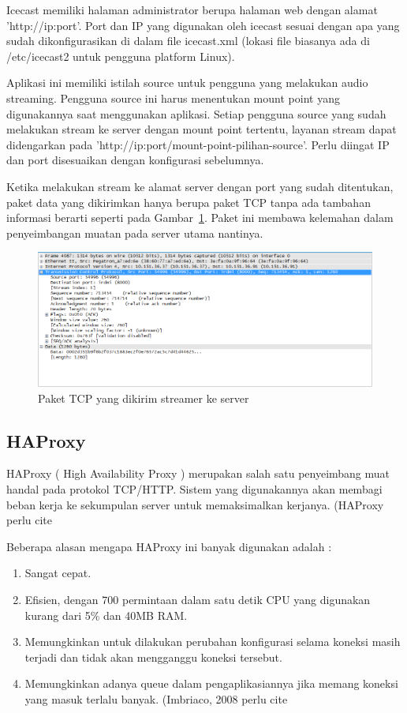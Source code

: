 \documentclass[conference]{IEEEtran}
\begin{document}
	\indent
	Icecast memiliki halaman administrator berupa halaman web dengan alamat 'http://ip:port'. Port dan IP yang digunakan oleh icecast sesuai dengan apa yang sudah dikonfigurasikan di dalam file icecast.xml (lokasi file biasanya ada di /etc/icecast2 untuk pengguna platform Linux).
	
	\indent
	Aplikasi ini memiliki istilah source untuk pengguna yang melakukan audio streaming. Pengguna source ini harus menentukan mount point yang digunakannya saat menggunakan aplikasi. Setiap pengguna source yang sudah melakukan stream ke server dengan mount point tertentu, layanan stream dapat didengarkan pada 'http://ip:port/mount-point-pilihan-source'. Perlu diingat IP dan port disesuaikan dengan konfigurasi sebelumnya.
	
	\indent
	Ketika melakukan stream ke alamat server dengan port yang sudah ditentukan, paket data yang dikirimkan hanya berupa paket TCP tanpa ada tambahan informasi berarti seperti pada Gambar~\ref{fig:tcp}. Paket ini membawa kelemahan dalam penyeimbangan muatan pada server utama nantinya.
	
	\begin{figure}
	\centering
	\includegraphics[width=1\linewidth]{tcp}
	\caption{Paket TCP yang dikirim streamer ke server}
	\label{fig:tcp}
	\end{figure}
	
	
	\subsection{HAProxy}
	HAProxy ( High Availability Proxy ) merupakan salah satu penyeimbang muat handal pada protokol TCP/HTTP. Sistem yang digunakannya akan membagi beban kerja ke sekumpulan server untuk memaksimalkan kerjanya. (HAProxy perlu cite
	
	\indent
	Beberapa alasan mengapa HAProxy ini banyak digunakan adalah :
	\begin{enumerate}
		\item Sangat cepat.
		\item Efisien, dengan 700 permintaan dalam satu detik CPU yang digunakan kurang dari 5\% dan 40MB RAM.
		\item Memungkinkan untuk dilakukan perubahan konfigurasi selama koneksi masih terjadi dan tidak akan mengganggu koneksi tersebut.
		\item Memungkinkan adanya queue dalam pengaplikasiannya jika memang koneksi yang masuk terlalu banyak. (Imbriaco, 2008 perlu cite
	\end{enumerate}
	
\end{document}

